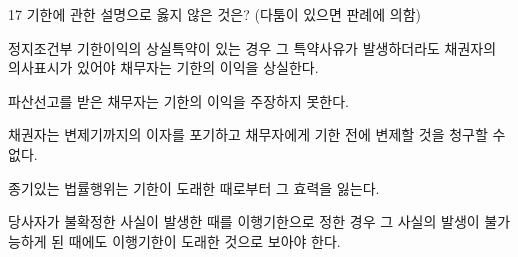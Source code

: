 \begin{question}{17}
기한에 관한 설명으로 옳지 않은 것은? (다툼이 있으면 판례에 의함)
\begin{choices}
  \item 정지조건부 기한이익의 상실특약이 있는 경우 그 특약사유가 발생하더라도 채권자의 의사표시가 있어야 채무자는 기한의 이익을 상실한다.
  \item 파산선고를 받은 채무자는 기한의 이익을 주장하지 못한다.
  \item 채권자는 변제기까지의 이자를 포기하고 채무자에게 기한 전에 변제할 것을 청구할 수 없다.
  \item 종기있는 법률행위는 기한이 도래한 때로부터 그 효력을 잃는다.
  \item 당사자가 불확정한 사실이 발생한 때를 이행기한으로 정한 경우 그 사실의 발생이 불가능하게 된 때에도 이행기한이 도래한 것으로 보아야 한다.
\end{choices}
\end{question}
